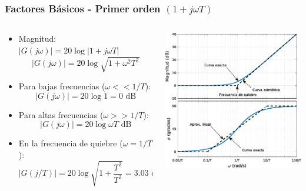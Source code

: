 \documentclass[aspectratio=169]{beamer}
\theoremstyle{definition}
\theoremstyle{plain}
\theoremstyle{remark}
\begin{document}
\begin{frame}[<+->]\frametitle{Factores Básicos - Primer orden $(1+j \omega T)$}
\begin{columns}
	\begin{column}{0.5\textwidth}
	\small
	\begin{itemize}
		\item Magnitud: $\left| G(j\omega) \right| = 20 \log \left| 1+j\omega T \right|$
		\begin{equation*}
			\left| G(j\omega) \right| = 20 \log \sqrt{1+\omega^2 T^2}
		\end{equation*}
		\item Para bajas frecuencias ($\omega << 1/T$):
		\begin{equation*}
			\left| G(j\omega) \right| = 20 \log 1 = 0 \text{ dB}
		\end{equation*}
		\item Para altas frecuencias ($\omega >> 1/T$):
		\begin{equation*}
			\left| G(j\omega) \right| = 20 \log \omega T \text{ dB}
		\end{equation*}
		\item En la frecuencia de quiebre ($\omega = 1/T$):
		\begin{equation*}
			\left| G(j/T) \right| = 20\log \sqrt{1 + \frac{T^2}{T^2}} = 3.03 \text{ dB}
		\end{equation*}
	\end{itemize}
	\end{column}
	\begin{column}{0.5\textwidth}
	\centering
	\includegraphics[width=6.5cm]{images/bodeFirstOrderDerivative.eps}
	\end{column}
\end{columns}
\end{frame}
\end{document}
